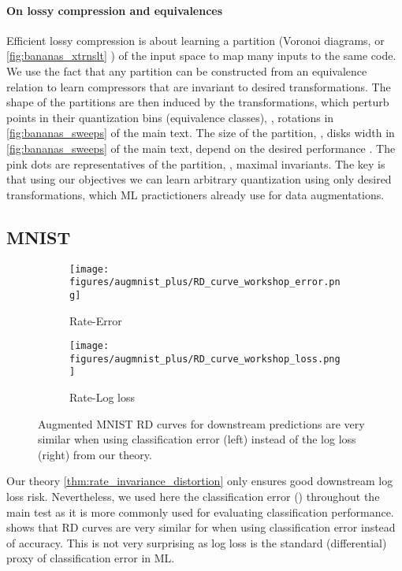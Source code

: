 \documentclass[final]{article}
\begin{document}
\paragraph{On lossy compression and equivalences}
Efficient lossy compression is about learning a partition (\eg Voronoi diagrams, or  \cref{fig:bananas_xtrnslt} ) of the input space to map many inputs to the same code.
We use the fact that any partition can be constructed from an equivalence relation \cite{schechter_handbook_1996} to learn compressors that are invariant to desired transformations.
The shape of the partitions are then induced by the transformations, which perturb points in their quantization bins (equivalence classes), \eg, rotations in \cref{fig:bananas_sweeps} of the main text.
The size of the partition, \eg, disks width in \cref{fig:bananas_sweeps} of the main text, depend on the desired performance .
The pink dots are representatives of the partition, \ie, maximal invariants.
The key is that using our objectives we can learn arbitrary quantization using only desired transformations, which ML practictioners already use for data augmentations.


\subsection{MNIST}
\label{appx:mnist}





\begin{figure}[ht]
     \centering
     \begin{subfigure}[h]{0.4\columnwidth}
         \centering
         \texttt{[image: figures/augmnist\_plus/RD\_curve\_workshop\_error.png]}
         \caption{Rate-Error}
         \label{fig:augmnist++_err}
     \end{subfigure}
     \hfill{}
     \begin{subfigure}[h]{0.4\columnwidth}
         \centering
         \texttt{[image: figures/augmnist\_plus/RD\_curve\_workshop\_loss.png]}
         \caption{Rate-Log loss}
         \label{fig:augmnist++_log}
     \end{subfigure}
\caption{
Augmented MNIST RD curves for downstream predictions are very similar when using classification error (left) instead of the log loss (right) from our theory.
}
\label{fig:augmnist++_err_vs_log}
\end{figure} 
Our theory \cref{thm:rate_invariance_distortion} only ensures good downstream log loss risk.
Nevertheless, we used here the classification error () throughout the main test as it is more commonly used for evaluating classification performance.
 shows that RD curves are very similar for when using classification error instead of accuracy.
This is not very surprising as log loss is the standard (differential) proxy of classification error in ML.
\end{document}

